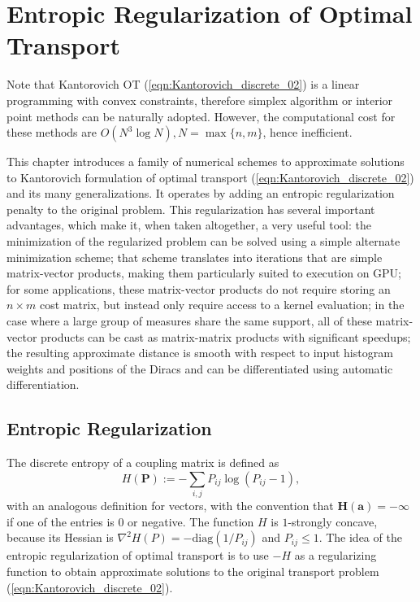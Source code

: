 \documentclass[11pt]{book}
\begin{document}
\chapter[Entropic Regularization]{Entropic Regularization of Optimal Transport}

Note that Kantorovich OT (\ref{eqn:Kantorovich_discrete_02}) is a linear programming with convex constraints, therefore simplex algorithm or interior point methods can be naturally adopted. However, the computational cost for these methods are $O(N^3 \log N), N = \max\{n,m\}$, hence inefficient. 

This chapter introduces a family of numerical schemes to approximate solutions to Kantorovich formulation of optimal transport (\ref{eqn:Kantorovich_discrete_02}) and its many generalizations. It operates by adding an entropic regularization penalty to the original problem. This regularization has several important advantages, which make it, when taken altogether, a very useful tool: the minimization of the regularized problem can be solved using a simple alternate minimization scheme; that scheme translates into iterations that are simple matrix-vector products, making them particularly suited to execution on GPU; for some applications, these matrix-vector products do not require storing an \(n \times m\) cost matrix, but instead only require access to a kernel evaluation; in the case where a large group of measures share the same support, all of these matrix-vector products can be cast as matrix-matrix products with significant speedups; the resulting approximate distance is smooth with respect to input histogram weights and positions of the Diracs and can be differentiated using automatic differentiation.


\section[Entropic Regularization]{Entropic Regularization}

The discrete entropy of a coupling matrix is defined as
\begin{equation}
H(\mathbf{P}) := -\sum_{i,j} P_{ij} \log(P_{ij} - 1), 
\end{equation}
with an analogous definition for vectors, with the convention that \(\mathbf{H}(\mathbf{a}) = -\infty\) if one of the entries is \(0\) or negative. The function \(H\) is \(1\)-strongly concave, because its Hessian is \(\nabla^2 H(P) = -\text{diag}(1/P_{ij})\) and \(P_{ij} \leq 1\). The idea of the entropic regularization of optimal transport is to use \(-H\) as a regularizing function to obtain approximate solutions to the original transport problem (\ref{eqn:Kantorovich_discrete_02}).
\end{document}
